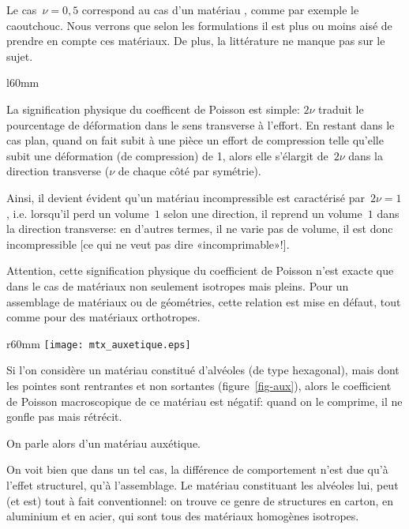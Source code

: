 \medskip
Le cas~$\nu=0,5$ correspond au cas d'un matériau , comme par exemple le caoutchouc. Nous verrons que selon les formulations il est plus ou moins aisé de prendre en compte ces matériaux. De plus, la littérature ne manque pas sur le sujet.

\medskip
\begin{wrapfigure}{l}{60mm}
  \centering
   \hfill
  \caption{Déformation et coefficient de Poisson}
\end{wrapfigure}
La signification physique du coefficent de Poisson est simple: $2\nu$ traduit le pourcentage de déformation dans le sens transverse à l'effort. En restant dans le cas plan, quand on fait subit à une pièce un effort de compression telle qu'elle subit une déformation (de compression) de 1, alors elle s'élargit de~$2\nu$ dans la direction transverse ($\nu$ de chaque côté par symétrie).

Ainsi, il devient évident qu'un matériau incompressible est caractérisé par~$2\nu=1$, i.e. lorsqu'il perd un volume~$1$ selon une direction, il reprend un volume~$1$ dans la direction transverse: en d'autres termes, il ne varie pas de volume, il est donc incompressible [ce qui ne veut pas dire «incomprimable»!].

\medskip
Attention, cette signification physique du coefficient de Poisson n'est exacte que dans le cas de matériaux non seulement isotropes mais pleins. Pour un assemblage de matériaux ou de géométries, cette relation est mise en défaut, tout comme pour des matériaux orthotropes.

\medskip
\begin{wrapfigure}{r}{60mm}
  \centering
  \texttt{[image: mtx\_auxetique.eps]}
  \caption{Matériau auxétique}\label{fig-aux}
\end{wrapfigure}
Si l'on considère un matériau constitué d'alvéoles (de type hexagonal), mais dont les pointes sont rentrantes et non sortantes (figure~\ref{fig-aux}), alors le coefficient de Poisson macroscopique de ce matériau est négatif: quand on le comprime, il ne gonfle pas mais rétrécit.

On parle alors d'un matériau auxétique.

On voit bien que dans un tel cas, la différence de comportement n'est due qu'à l'effet structurel, qu'à l'assemblage. Le matériau constituant les alvéoles lui, peut (et est) tout à fait conventionnel: on trouve ce genre de structures en carton, en aluminium et en acier, qui sont tous des matériaux homogènes isotropes.


